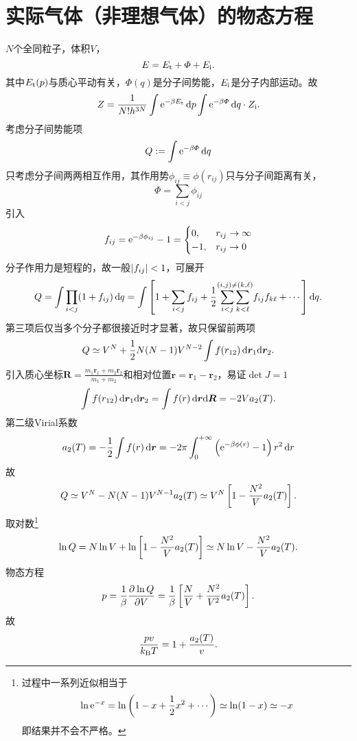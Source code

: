 \section[实际气体的物态方程]{实际气体（非理想气体）的物态方程}
$N$个全同粒子，体积$V$，
\[
	E=E_\mathrm t+\varPhi+E_{\mathrm{i}}.
\]
其中$E_\mathrm t(p)$与质心平动有关，$\varPhi(q)$是分子间势能，$E_{\mathrm{i}}$是分子内部运动。故
\[
	Z=\frac1{N!h^{3N}}\int\mathop{}\!\mathrm{e}^{-\beta E_\mathrm t}\mathop{}\!\mathrm{d} p\int\mathop{}\!\mathrm{e}^{-\beta\varPhi}\mathop{}\!\mathrm{d} q\cdot Z_{\mathrm{i}}.
\]
考虑分子间势能项
\[
	Q:=\int\mathop{}\!\mathrm{e}^{-\beta\varPhi}\mathop{}\!\mathrm{d} q
\]
只考虑分子间两两相互作用，其作用势$\phi_{ij}\equiv\phi(r_{ij})$只与分子间距离有关，
\[
	\varPhi=\sum_{i<j}\phi_{ij}
\]
引入
\[
	f_{ij}=\mathop{}\!\mathrm{e}^{-\beta\phi_{ij}}-1=
	\begin{cases}
		0,&r_{ij}\to\infty\\
		-1,&r_{ij}\to0
	\end{cases}
\]
分子作用力是短程的，故一般$\left\lvert f_{ij}\right\rvert<1$，可展开
\[
	Q=\int\prod_{i<j}(1+f_{ij})\mathop{}\!\mathrm{d} q=\int\left[1+\sum_{i<j}f_{ij}+\frac12\overset{(i,j)\neq(k,\ell)}{\sum_{i<j}\sum_{k<\ell}}f_{ij}f_{k\ell}+\cdots\right]\mathop{}\!\mathrm{d} q.
\]
第三项后仅当多个分子都很接近时才显著，故只保留前两项
\[
	Q\simeq V^N+\frac12N(N-1)V^{N-2}\int f(r_{12})\mathop{}\!\mathrm{d}\bm r_1\mathrm{d}\bm r_2.
\]
引入质心坐标$\bm R=\frac{m_1\bm r_1+m_2\bm r_2}{m_1+m_2}$和相对位置$\bm r=\bm r_1-\bm r_2$，易证$\det J=1$
\[
	\int f(r_{12})\mathop{}\!\mathrm{d}\bm r_1\mathrm{d}\bm r_2=\int f(r)\mathop{}\!\mathrm{d}\bm r\mathrm{d}\bm R=-2Va_2(T).
\]
第二级Virial系数
\begin{align}
	a_2(T)=-\frac12\int f(r)\mathop{}\!\mathrm{d}\bm r=-2\pi\int_0^{+\infty}\left(\mathop{}\!\mathrm{e}^{-\beta\phi(r)}-1\right)r^2\mathop{}\!\mathrm{d} r
\end{align}
故
\[
	Q\simeq V^N-N(N-1)V^{N-1}a_2(T)\simeq V^N\left[1-\frac{N^2}Va_2(T)\right].
\]
取对数\footnote{过程中一系列近似相当于
\[
	\ln\mathop{}\!\mathrm{e}^{-x}=\ln\left(1-x+\frac12x^2+\cdots\right)\simeq\ln(1-x)\simeq -x
\]
即结果并不会不严格。}
\begin{align}
	\ln Q=N\ln V+\ln\left[1-\frac{N^2}Va_2(T)\right]\simeq N\ln V-\frac{N^2}Va_2(T).
\end{align}
物态方程
\begin{align*}
	p=\frac1\beta\frac{\partial^{{}}\ln Q}{\partial{V}^{{}}}=\frac1\beta\left[\frac NV+\frac{N^2}{V^2}a_2(T)\right].
\end{align*}
故
\begin{align}
	\frac{pv}{k_{\mathrm B} T}=1+\frac{a_2(T)}v.
\end{align}
